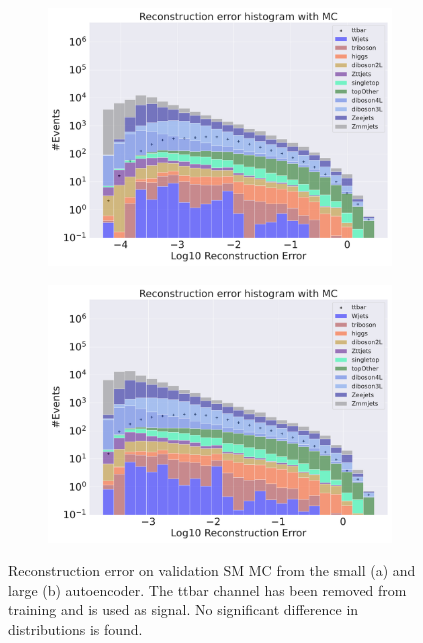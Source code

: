 \begin{figure}[H]
    \centering
    \begin{subfigure}{.45\textwidth}
        \includegraphics[width=\textwidth]{Figures/AE_testing/small/b_data_recon_big_rm3_feats_sig_ttbar.pdf}
        \caption{}
        \label{fig:ae_small_ttbar}
    \end{subfigure}
    \hfill 
    \begin{subfigure}{.45\textwidth}
        \includegraphics[width=\textwidth]{Figures/AE_testing/big/b_data_recon_big_rm3_feats_sig_ttbar.pdf}
        \caption{ }
        \label{fig:ae_big_ttbar}
    \end{subfigure}
    \hfill 
    \caption[AE | Reconstruction error using ttbar channel as signal]{Reconstruction error on validation SM MC from the small (a) and large (b) autoencoder. The ttbar channel has been removed from training and 
    is used as signal. No significant difference in distributions is found.  }
    \label{fig:ae_big_channel_3}
\end{figure}



